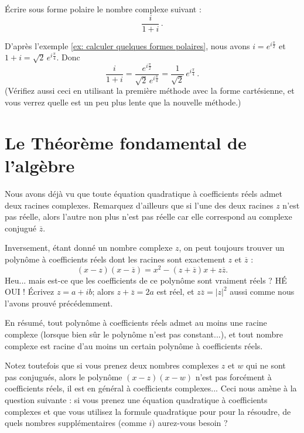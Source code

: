 \begin{myprob}
Écrire sous forme polaire le nombre complexe suivant : 
$$
\frac{i}{1+i}\, .
$$

\begin{mysol}
D'après l'exemple \ref{ex: calculer quelques formes polaires}, nous avons $i = e^{i\frac{\pi}{2}}$ et
$1+i = \sqrt{2}\,e^{i\frac{\pi}{4}}$.
Donc
$$
\frac{i}{1+i} = \frac{e^{i\frac{\pi}{2}}}{\sqrt{2}\,e^{i\frac{\pi}{4}}}
 = \frac{1}{\sqrt{2}}\,e^{i\frac{\pi}{4}}\, .
$$
(Vérifiez aussi ceci en utilisant la première méthode avec la forme cartésienne, et vous verrez quelle est un peu plus lente que la nouvelle méthode.)
\end{mysol}
\end{myprob}

\section{Le Théorème fondamental de l'algèbre}



Nous avons déjà vu que toute équation quadratique à coefficients réels admet deux racines complexes. Remarquez d'ailleurs que si l'une des deux racines $z$ n'est pas réelle, alors l'autre non plus n'est pas réelle car elle correspond au complexe conjugué $\overline{z}$. 

Inversement, étant donné un nombre complexe $z$, on peut toujours trouver un polynôme à coefficients réels dont les
racines sont exactement $z$ et $\overline{z}$ :
$$
(x-z)(x-\overline{z}) = x^2 -(z+\overline{z})x + z \overline{z}.
$$
Heu... mais est-ce que les coefficients de ce polynôme sont vraiment réels ?  HÉ OUI !  Écrivez
$z = a+ib$; alors $z+\overline{z} = 2a$ est réel, et
$z \overline{z} = |z|^2$ aussi comme nous l'avons prouvé précédemment.

En résumé, tout polynôme à coefficients réels admet au moins une racine complexe (lorsque bien sûr le polynôme n'est pas constant...), et tout nombre complexe est racine d'au moins un certain polynôme à coefficients réels.

Notez toutefois que si vous prenez deux nombres complexes $z$ et $w$ qui ne sont pas conjugués, alors le polynôme $(x-z)(x-w)$ n'est pas forcément à coefficients réels, il est en général à coefficients complexes...
Ceci nous amène à la question suivante : si vous prenez une équation quadratique
à coefficients complexes et que vous utilisez la formule quadratique pour
pour la résoudre, de quels nombres supplémentaires (comme $i$) aurez-vous besoin ?

